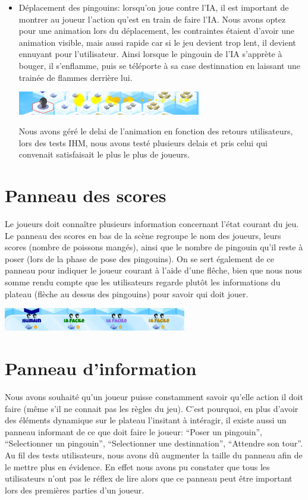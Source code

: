 \documentclass{report}
\begin{document}
\begin{itemize}
\item Déplacement des pingouins: lorsqu'on joue contre l'IA, il est important de montrer au joueur l'action qu'est en train de faire l'IA. Nous avons optez pour une animation lors du déplacement, les contraintes étaient d'avoir une animation visible, mais aussi rapide car si le jeu devient trop lent, il devient ennuyant pour l'utilisateur. Ainsi lorsque le pingouin de l'IA s'apprète à bouger, il s'enflamme, puis se téléporte à sa case destinnation en laissant une trainée de flammes derrière lui.
  \begin{center}
    \includegraphics[width=8cm]{image/pingouin_deplacement.png}    
  \end{center}
  Nous avons géré le delai de l'animation en fonction des retours utilisateurs, lors des tests IHM, nous avons testé plusieurs delais et pris celui qui convenait satisfaisait le plus le plus de joueurs.
\end{itemize}

\section{Panneau des scores}
Le joueurs doit connaître plusieurs information concernant l'état courant du jeu. Le panneau des scores en bas de la scène regroupe le nom des joueurs, leurs scores (nombre de poissons mangés), ainsi que le nombre de pingouin qu'il reste à poser (lors de la phase de pose des pingouins). On se sert également de ce panneau pour indiquer le joueur courant à l'aide d'une flêche, bien que nous nous somme rendu compte que les utilisateurs regarde plutôt les informations du plateau (flèche au dessus des pingouins) pour savoir qui doit jouer.
  \begin{center}
    \includegraphics[width=8cm]{image/tableau_scores.png}    
  \end{center}

\section{Panneau d'information}
Nous avons souhaité qu'un joueur puisse constamment savoir qu'elle action il doit faire (même s'il ne connait pas les règles du jeu). C'est pourquoi, en plus d'avoir des éléments dynamique sur le plateau l'insitant à intéragir, il existe aussi un panneau informant de ce que doit faire le joueur: ``Poser un pingouin'', ``Selectionner un pingouin'', ``Selectionner une destinnation'', ``Attendre son tour''. Au fil des tests utilisateurs, nous avons dû augmenter la taille du panneau afin de le mettre plus en évidence. En effet nous avons pu constater que tous les utilisateurs n'ont pas le réflex de lire alors que ce panneau peut être important lors des premières parties d'un joueur.
\end{document}
